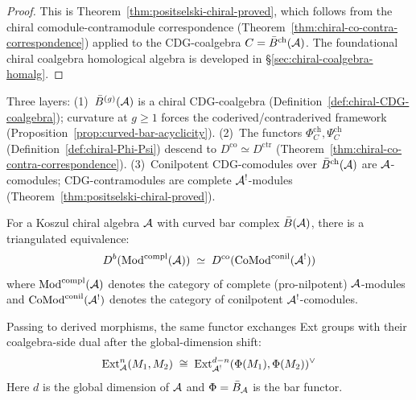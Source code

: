 \begin{proof}
This is Theorem~\ref{thm:positselski-chiral-proved}, which follows
from the chiral comodule-contramodule correspondence
(Theorem~\ref{thm:chiral-co-contra-correspondence}) applied to the
CDG-coalgebra $C = \bar{B}^{\mathrm{ch}}(\mathcal{A})$.  The foundational
chiral coalgebra homological algebra is developed in
\S\ref{sec:chiral-coalgebra-homalg}.
\end{proof}

\begin{remark}
\label{rem:positselski-proof-strategy}
Three layers: (1)~$\bar{B}^{(g)}(\mathcal{A})$ is a chiral CDG-coalgebra (Definition~\ref{def:chiral-CDG-coalgebra}); curvature at $g \geq 1$ forces the coderived/contraderived framework (Proposition~\ref{prop:curved-bar-acyclicity}).  (2)~The functors $\Phi_C^{\mathrm{ch}}, \Psi_C^{\mathrm{ch}}$ (Definition~\ref{def:chiral-Phi-Psi}) descend to $D^{\mathrm{co}} \simeq D^{\mathrm{ctr}}$ (Theorem~\ref{thm:chiral-co-contra-correspondence}).  (3)~Conilpotent CDG-comodules over $\bar{B}^{\mathrm{ch}}(\mathcal{A})$ are $\mathcal{A}$-comodules; CDG-contramodules are complete $\mathcal{A}^!$-modules (Theorem~\ref{thm:positselski-chiral-proved}).
\end{remark}

\begin{theorem}
\label{thm:full-derived-module-equiv}
For a Koszul chiral algebra $\mathcal{A}$ with curved bar complex
$\bar{B}(\mathcal{A})$, there is a triangulated equivalence:
\begin{equation}\label{eq:full-derived-equiv}
D^b(\mathrm{Mod}^{\mathrm{compl}}(\mathcal{A}))
\;\simeq\;
D^{\mathrm{co}}(\mathrm{CoMod}^{\mathrm{conil}}(\mathcal{A}^!))
\end{equation}
where $\mathrm{Mod}^{\mathrm{compl}}(\mathcal{A})$ denotes the category
of complete \textup{(}pro-nilpotent\textup{)} $\mathcal{A}$-modules
and $\mathrm{CoMod}^{\mathrm{conil}}(\mathcal{A}^!)$ denotes the
category of conilpotent $\mathcal{A}^!$-comodules.

Passing to derived morphisms, the same functor exchanges Ext groups with
their coalgebra-side dual after the global-dimension shift:
\begin{equation}\label{eq:ext-duality-full}
\mathrm{Ext}^n_{\mathcal{A}}(M_1, M_2)
\;\cong\;
\mathrm{Ext}^{d-n}_{\mathcal{A}^!}(\Phi(M_1), \Phi(M_2))^{\vee}
\end{equation}
Here $d$ is the global dimension of $\mathcal{A}$ and
$\Phi = \bar{B}_{\mathcal{A}}$ is the bar functor.
\end{theorem}

